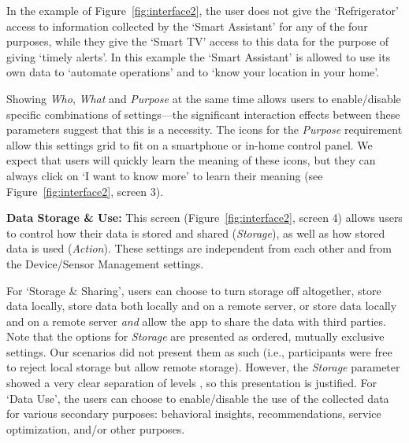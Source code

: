 In the example of Figure~\ref{fig:interface2}, the user does not give the `Refrigerator' access to information collected by the `Smart Assistant' for any of the four purposes, while they give the `Smart TV' access to this data for the purpose of giving `timely alerts'. In this example the `Smart Assistant' is allowed to use its own data to `automate operations' and to `know your location in your home'.

Showing \emph{Who}, \emph{What} and \emph{Purpose} at the same time allows users to enable/disable specific combinations of settings---the significant interaction effects between these parameters suggest that this is a necessity. The icons for the \emph{Purpose} requirement allow this settings grid to fit on a smartphone or in-home control panel. We expect that users will quickly learn the meaning of these icons, but they can always click on `I want to know more' to learn their meaning (see Figure~\ref{fig:interface2}, screen 3). 



\textbf{Data Storage \& Use:} This screen (Figure~\ref{fig:interface2}, screen 4) allows users to control how their data is stored and shared (\emph{Storage}), as well as how stored data is used (\emph{Action}). These settings are independent from each other and from the Device/Sensor Management settings. 

For `Storage \& Sharing', users can choose to turn storage off altogether, store data locally, store data both locally and on a remote server, or store data locally and on a remote server \emph{and} allow the app to share the data with third parties. Note that the options for \emph{Storage} are presented as ordered, mutually exclusive settings. Our scenarios did not present them as such (i.e., participants were free to reject local storage but allow remote storage). However, the \emph{Storage} parameter showed a very clear separation of levels%
, so this presentation is justified. For `Data Use', the users can choose to enable/disable the use of the collected data for various secondary purposes: behavioral insights, recommendations, service optimization, and/or other purposes.

